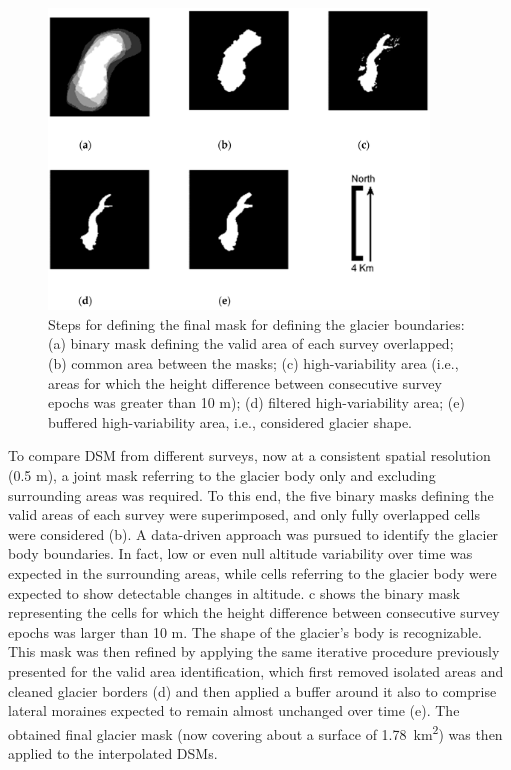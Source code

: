 \begin{figure}[ht]
    \centering
    \includegraphics[width=0.9\textwidth]{glacier_masks.png}
    \caption{Steps for defining the final mask for defining the glacier boundaries: (a) binary mask defining the valid area of each survey overlapped; (b) common area between the masks; (c) high-variability area (i.e., areas for which the height difference between consecutive survey epochs was greater than 10 m); (d) filtered high-variability area; (e) buffered high-variability area, i.e., considered glacier shape. }
    \label{fig:2:glacier_masks}
\end{figure}

To compare DSM from different surveys, now at a consistent spatial resolution (0.5 m), a joint mask referring to the glacier body only and excluding surrounding areas was required.
To this end, the five binary masks defining the valid areas of each survey were superimposed, and only fully overlapped cells were considered (b).
A data-driven approach was pursued to identify the glacier body boundaries. 
In fact, low or even null altitude variability over time was expected in the surrounding areas, while cells referring to the glacier body were expected to show detectable changes in altitude. 
c shows the binary mask representing the cells for which the height difference between consecutive survey epochs was larger than 10 m. 
The shape of the glacier's body is recognizable. 
This mask was then refined by applying the same iterative procedure previously presented for the valid area identification, which first removed isolated areas and cleaned glacier borders (d) and then applied a buffer around it also to comprise lateral moraines expected to remain almost unchanged over time (e). 
The obtained final glacier mask (now covering about a surface of \SI{1.78}{\kilo\meter\squared}) was then applied to the interpolated DSMs.

